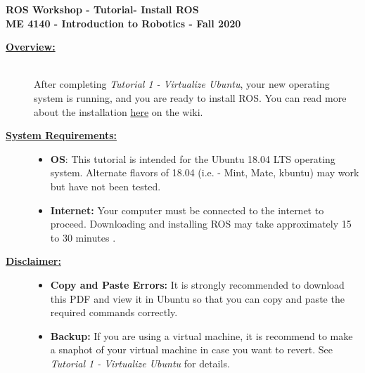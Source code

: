 \documentclass[12pt]{article}
\newcommand{\MNUM}{3} %
\newcommand{\MNAME}{Install ROS} %
\begin{document}
\thispagestyle{plain}

\begin{center}
   {\bf \Large ROS Workshop - Tutorial\hspc\MNUM\hspc - \MNAME}\vspace{3mm}\\
   {\bf \large ME 4140 - Introduction to Robotics - Fall 2020} \vspace{5mm}\\
\end{center}

\begin{description}

\item[\textbf{\underline{Overview:}}] \hfill \vspace{3mm}\\
After completing {\it Tutorial 1 - Virtualize Ubuntu}, your new operating system is running, and you are ready to install ROS. You can read more about the installation \href{http://wiki.ros.org/melodic/Installation/Ubuntu}{here} on the wiki.

\item[\textbf{\underline{System Requirements:}}] \hfill \vspace{0mm}

\begin{itemize}
	\item {\bf OS}: This tutorial is intended for the Ubuntu 18.04 LTS operating system. Alternate flavors of 18.04 (i.e. - Mint, Mate, kbuntu) may work but have not been tested.
	\item {\bf Internet:} Your computer must be connected to the internet to proceed. Downloading and installing ROS may take approximately 15 to 30 minutes .


\end{itemize}

\item[\textbf{\underline{Disclaimer:}}] \hfill \vspace{0mm}

\begin{itemize}
	\item {\bf\R Copy and Paste Errors:} {\R It is strongly recommended to download this PDF and view it in Ubuntu so that you can copy and paste the required commands correctly.}

	\item {\bf Backup: } If you are using a virtual machine, it is recommend to make a snaphot of your virtual machine in case you want to revert. See {\it Tutorial 1 - Virtualize Ubuntu } for details.   
\end{itemize}


\end{description}
\end{document}
